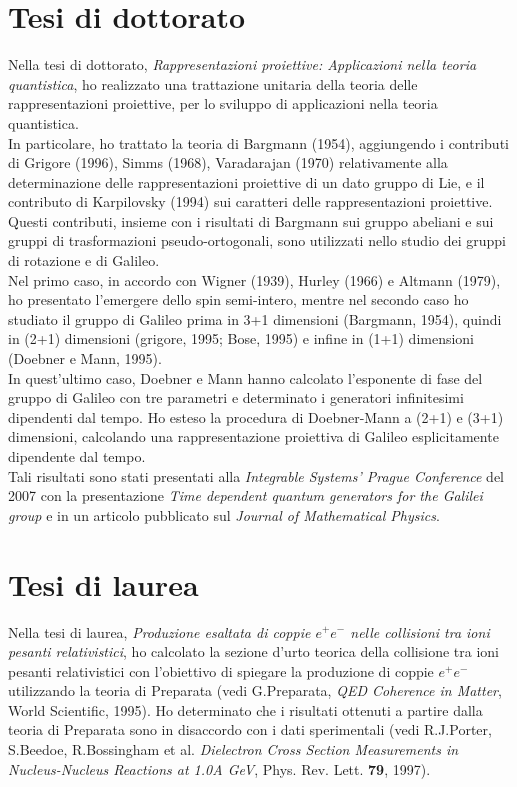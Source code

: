 \documentclass[a4paper,latin1,italian]{article}
\begin{document}
\section{Tesi di dottorato}
Nella tesi di dottorato, \emph{Rappresentazioni proiettive: Applicazioni nella teoria quantistica}, ho realizzato una trattazione unitaria della teoria delle rappresentazioni proiettive, per lo sviluppo di applicazioni nella teoria quantistica.\\
In particolare, ho trattato la teoria di Bargmann (1954), aggiungendo i contributi di Grigore (1996), Simms (1968), Varadarajan (1970) relativamente alla determinazione delle rappresentazioni proiettive di un dato gruppo di Lie, e il contributo di Karpilovsky (1994) sui caratteri delle rappresentazioni proiettive.\\
Questi contributi, insieme con i risultati di Bargmann sui gruppo abeliani e sui gruppi di trasformazioni pseudo-ortogonali, sono utilizzati nello studio dei gruppi di rotazione e di Galileo.\\
Nel primo caso, in accordo con Wigner (1939), Hurley (1966) e Altmann (1979), ho presentato l'emergere dello spin semi-intero, mentre nel secondo caso ho studiato il gruppo di Galileo prima in 3+1 dimensioni (Bargmann, 1954), quindi in (2+1) dimensioni (grigore, 1995; Bose, 1995) e infine in (1+1) dimensioni (Doebner e Mann, 1995).\\
In quest'ultimo caso, Doebner e Mann hanno calcolato l'esponente di fase del gruppo di Galileo con tre parametri e determinato i generatori infinitesimi dipendenti dal tempo. Ho esteso la procedura di Doebner-Mann a (2+1) e (3+1) dimensioni, calcolando una rappresentazione proiettiva di Galileo esplicitamente dipendente dal tempo.\\
Tali risultati sono stati presentati alla \emph{Integrable Systems' Prague Conference} del 2007 con la presentazione \emph{Time dependent quantum generators for the Galilei group} e in un articolo pubblicato sul \emph{Journal of Mathematical Physics}.
%
\section{Tesi di laurea}
Nella tesi di laurea, \emph{Produzione esaltata di coppie $e^+ e^-$ nelle collisioni tra ioni pesanti relativistici}, ho calcolato la sezione d'urto teorica della collisione tra ioni pesanti relativistici con l'obiettivo di spiegare la produzione di coppie $e^+ e^-$ utilizzando la teoria di Preparata (vedi G.Preparata, \emph{QED Coherence in Matter}, World Scientific, 1995). Ho determinato che i risultati ottenuti a partire dalla teoria di Preparata sono in disaccordo con i dati sperimentali (vedi R.J.Porter, S.Beedoe, R.Bossingham et al. \emph{Dielectron Cross Section Measurements in Nucleus-Nucleus Reactions at 1.0A GeV}, Phys. Rev. Lett. \textbf{79}, 1997).
\end{document}
